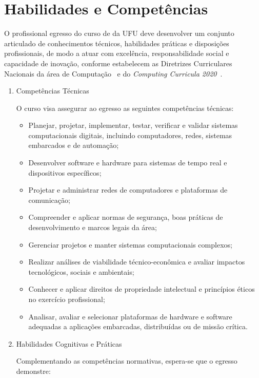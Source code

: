 \section{Habilidades e Competências}

O profissional egresso do curso de \nomecursonovo da UFU deve desenvolver um conjunto articulado de conhecimentos técnicos, habilidades práticas e disposições profissionais, de modo a atuar com excelência, responsabilidade social e capacidade de inovação, conforme estabelecem as Diretrizes Curriculares Nacionais da área de Computação~\cite{MEC:CNE:CES:5:2016} e do \textit{Computing Curricula 2020}~\cite{ACM:CC2020}.

\begin{enumerate}[label=\Roman*.]
\item Competências Técnicas~\cite{MEC:CNE:CES:5:2016}

O curso visa assegurar ao egresso as seguintes competências técnicas:

\begin{itemize}
    \item Planejar, projetar, implementar, testar, verificar e validar sistemas computacionais digitais, incluindo computadores, redes, sistemas embarcados e de automação;
    \item Desenvolver software e hardware para sistemas de tempo real e dispositivos específicos;
    \item Projetar e administrar redes de computadores e plataformas de comunicação;
    \item Compreender e aplicar normas de segurança, boas práticas de desenvolvimento e marcos legais da área;
    \item Gerenciar projetos e manter sistemas computacionais complexos;
    \item Realizar análises de viabilidade técnico-econômica e avaliar impactos tecnológicos, sociais e ambientais;
    \item Conhecer e aplicar direitos de propriedade intelectual e princípios éticos no exercício profissional;
    \item Analisar, avaliar e selecionar plataformas de hardware e software adequadas a aplicações embarcadas, distribuídas ou de missão crítica.
\end{itemize}

\item Habilidades Cognitivas e Práticas~\cite{ACM:CC2020}

Complementando as competências normativas, espera-se que o egresso demonstre:


\end{enumerate}
